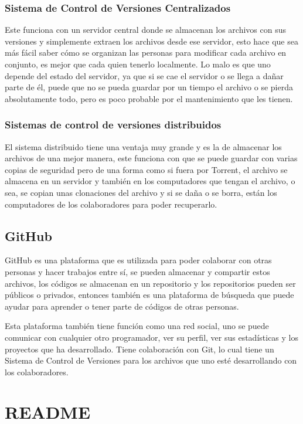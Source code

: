 \documentclass[conference]{IEEEtran}
\begin{document}
\subsubsection{Sistema de Control de Versiones Centralizados}
Este funciona con un servidor central donde se almacenan los archivos con sus versiones y simplemente extraen los archivos desde ese servidor, esto hace que sea más fácil saber cómo se organizan las personas para modificar cada archivo en conjunto, es mejor que cada quien tenerlo localmente. Lo malo es que uno depende del estado del servidor, ya que si se cae el servidor o se llega a dañar parte de él, puede que no se pueda guardar por un tiempo el archivo o se pierda absolutamente todo, pero es poco probable por el mantenimiento que les tienen.

\subsubsection{Sistemas de control de versiones distribuidos}
El sistema distribuido tiene una ventaja muy grande y es la de almacenar los archivos de una mejor manera, este funciona con que se puede guardar con varias copias de seguridad pero de una forma como si fuera por Torrent, el archivo se almacena en un servidor y también en los computadores que tengan el archivo, o sea, se copian unas clonaciones del archivo y si se daña o se borra, están los computadores de los colaboradores para poder recuperarlo.

\subsection{GitHub}
GitHub es una plataforma que es utilizada para poder colaborar con otras personas y hacer trabajos entre sí, se pueden almacenar y compartir estos archivos, los códigos se almacenan en un repositorio y los repositorios pueden ser públicos o privados, entonces también es una plataforma de búsqueda que puede ayudar para aprender o tener parte de códigos de otras personas.

Esta plataforma también tiene función como una red social, uno se puede comunicar con cualquier otro programador, ver su perfil, ver sus estadísticas y los proyectos que ha desarrollado. Tiene colaboración con Git, lo cual tiene un Sistema de Control de Versiones para los archivos que uno esté desarrollando con los colaboradores.

\section{README}
\end{document}
